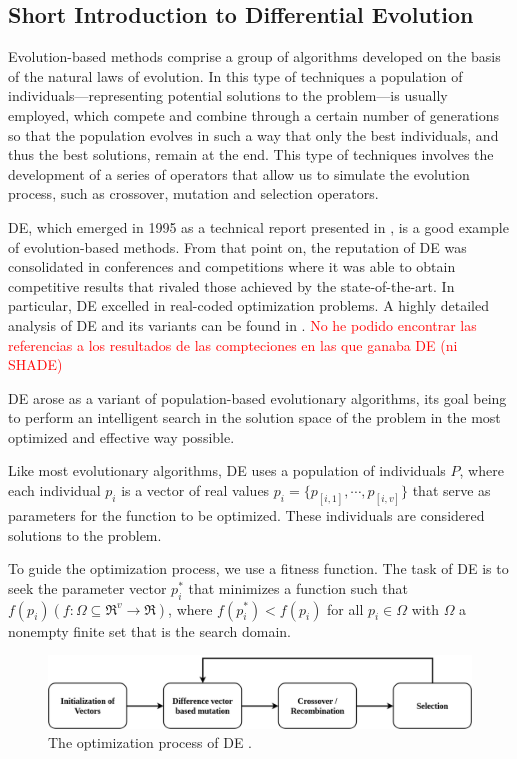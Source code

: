 \documentclass[review]{elsarticle}
\begin{document}
\subsection{Short Introduction to Differential Evolution} \label{sec:BackDE}

Evolution-based methods comprise a group of algorithms developed on the basis of the natural laws of evolution. In this type of techniques a population of individuals---representing potential solutions to the problem---is usually employed, which compete and combine through a certain number of generations so that the population evolves in such a way that only the best individuals, and thus the best solutions, remain at the end. This type of techniques involves the development of a series of operators that allow us to simulate the evolution process, such as crossover, mutation and selection operators. \cite{fausto2019ants}

DE, which emerged in 1995 as a technical report presented in \cite{storn1997differential}, is a good example of evolution-based methods. From that point on, the reputation of DE was consolidated in conferences and competitions where it was able to obtain competitive results that rivaled those achieved by the state-of-the-art. In particular, DE excelled in real-coded optimization problems. A highly detailed analysis of DE and its variants can be found in \cite{das2011differential}. \textcolor{red}{No he podido encontrar las referencias a los resultados de las compteciones en las que ganaba DE (ni SHADE)}

DE arose as a variant of population-based evolutionary algorithms, its goal being to perform an intelligent search in the solution space of the problem in the most optimized and effective way possible.

Like most evolutionary algorithms, DE uses a population of individuals $P$, where each individual $p_i$ is a vector of real values $p_i = \{p_{[i,1]},\cdots,p_{[i,v]}\}$ that serve as parameters for the function to be optimized. These individuals are considered solutions to the problem.

To guide the optimization process, we use a fitness function. The task of DE is to seek the parameter vector $p_i^*$ that minimizes a function such that $f(p_i)(f: \Omega \subseteq \mathfrak{R}^{v} \rightarrow \mathfrak{R})$, where $f(p_i^*) < f(p_i)$ for all $p_i \in \Omega$ with $\Omega$ a nonempty finite set that is the search domain.

\begin{figure}[!h]
	\centering
	\includegraphics[scale=0.3]{Figures/DEop.png}
	\caption{The optimization process of DE \cite{das2011differential}.}\label{img:DE}
\end{figure}
\end{document}
